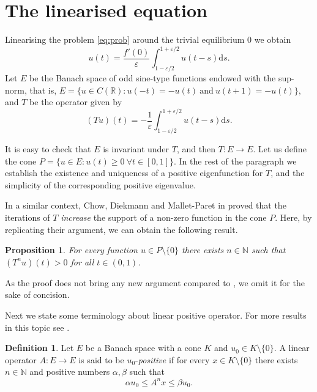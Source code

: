 \documentclass[a4paper,11pt]{article}
\theoremstyle{plain}
\newtheorem{prop}[thm]{Proposition}
\theoremstyle{definition}
\theoremstyle{definition}
\newtheorem{defi}{Definition}[section]
\newcommand{\N}{\mathbb{N}}
\newcommand{\R}{\mathbb{R}}
\newcommand{\dd}{\mathrm{d}}
\numberwithin{equation}{section}
\begin{document}
\section{The linearised equation}\label{sec:eigenvalue}

Linearising the problem \eqref{eq:prob} around the trivial equilibrium 0 we obtain
\begin{equation}\label{eq:linear}
    u(t) = \frac{f'(0)}{\varepsilon}\int_{1-\varepsilon/2}^{1+\varepsilon/2} u(t-s)\dd s.
\end{equation}
Let $E$ be the Banach space of odd sine-type functions endowed with the sup-norm, that is, $E=\{ u\in C(\R) \colon u(-t)=-u(t)~\text{and}~ u(t+1)=-u(t) \}$, and $T$ be the operator given by
\begin{equation}\label{eq:op_linear}
    (Tu)(t) = -\frac{1}{\varepsilon}\int_{1-\varepsilon/2}^{1+\varepsilon/2} u(t-s)\dd s.
\end{equation}

It is easy to check that $E$ is invariant under $T$, and then $T\colon E \to E$. Let us define the cone $P=\{ u\in E \colon u(t)\geq0~\forall t\in[0,1] \}$. In the rest of the paragraph we establish the existence and uniqueness of a positive eigenfunction for $T$, and the simplicity of the corresponding positive eigenvalue.

In a similar context, Chow, Diekmann and Mallet-Paret in \cite[Proposition 3.4]{CDM}  proved that the iterations of $T$ {\it increase} the support of a non-zero function in the cone $P$. Here, by replicating their argument, we can obtain the  following result.
\begin{prop}\label{prop:positivity}
    For every function $u\in P\setminus \{0\}$ there exists $n\in\N$ such that $(T^n u)(t)>0$ for all $t\in(0,1)$.
\end{prop}
As the proof does not bring any new argument compared to \cite[Proposition 3.4]{CDM}, we omit it for the sake of concision.

Next we state some terminology about linear positive operator. For more results in this topic see \cite{MAK}.

\begin{defi}
    Let $E$ be a Banach space with a cone $K$ and $u_0\in K\setminus\{0\}$. A linear operator $A\colon E\to E$ is said to be $u_0$-\emph{positive} if for every $x\in K\setminus\{0\}$ there exists $n\in\N$ and positive numbers $\alpha,\beta$ such that
    \[
        \alpha u_0 \leq A^n x \leq \beta u_0.
    \]
\end{defi}
\end{document}
